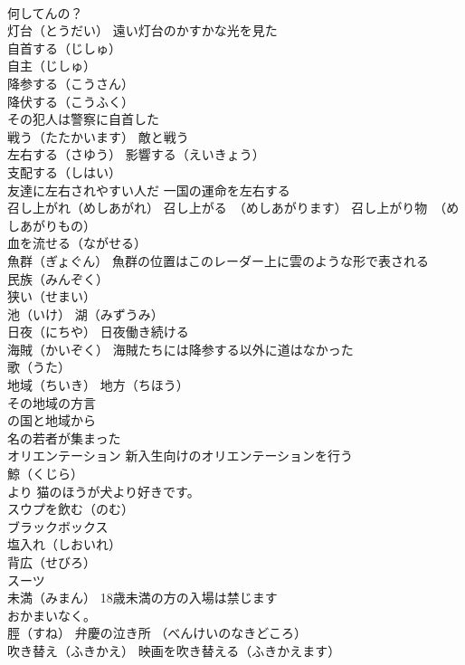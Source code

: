 \documentclass[8pt]{extreport}
\begin{document}
\begin{CJK}{UTF8}{min}
\\	何してんの？
\\	灯台（とうだい） 遠い灯台のかすかな光を見た
\\	自首する（じしゅ）
\\	自主（じしゅ）
\\	降参する（こうさん）
\\	降伏する（こうふく）
\\	その犯人は警察に自首した
\\	戦う（たたかいます） 敵と戦う
\\	左右する（さゆう） 影響する（えいきょう） 
\\	支配する（しはい） 
\\	友達に左右されやすい人だ 一国の運命を左右する
\\	召し上がれ（めしあがれ） 召し上がる　（めしあがります） 召し上がり物　（めしあがりもの）
\\	血を流せる（ながせる）
\\	魚群（ぎょぐん） 魚群の位置はこのレーダー上に雲のような形で表される
\\	民族（みんぞく）
\\	狭い（せまい）
\\	池（いけ） 湖（みずうみ）
\\	日夜（にちや） 日夜働き続ける
\\	海賊（かいぞく） 海賊たちには降参する以外に道はなかった
\\	歌（うた）
\\	地域（ちいき） 地方（ちほう）
\\	その地域の方言 
\\	の国と地域から 
\\	名の若者が集まった
\\	オリエンテーション 新入生向けのオリエンテーションを行う
\\	鯨（くじら）
\\	より 猫のほうが犬より好きです。
\\	スウプを飲む（のむ）
\\	ブラックボックス
\\	塩入れ（しおいれ）
\\	背広（せびろ）
\\	スーツ 
\\	未満（みまん） 18歳未満の方の入場は禁じます
\\	おかまいなく。
\\	脛（すね） 弁慶の泣き所 （べんけいのなきどころ）
\\	吹き替え（ふきかえ） 映画を吹き替える（ふきかえます）

\end{CJK}
\end{document}
